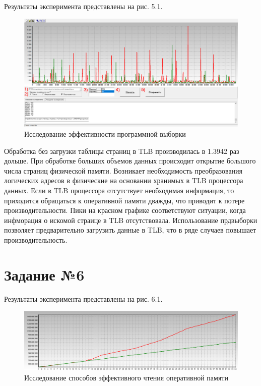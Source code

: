 Результаты эксперимента представлены на рис. 5.1.

\begin{figure}[H]
	\begin{center}
		\includegraphics[scale=0.5]{assets/task5.png}
	\end{center}
	\caption{Исследование эффективности программной выборки}
\end{figure}

Обработка без загрузки таблицы страниц в TLB производилась в 1.3942 раз дольше. При обработке больших объемов данных происходит открытие большого числа страниц физической памяти. Возникает необходимость преобразования логических адресов в физические на основании хранимых в TLB процессора данных. Если в TLB процессора отсутствует необходимая информация, то приходится обращаться к оперативной памяти дважды, что приводит к потере производительности. Пики на красном графике соответствуют ситуации, когда инфморация о искомой страице в TLB отсутствовала. Использование прдвыборки позволяет предварительно загрузить данные в TLB, что в ряде случаев повышает производительность.

\chapter{Задание №6}

Результаты эксперимента представлены на рис. 6.1.

\begin{figure}[H]
	\begin{center}
		\includegraphics[scale=0.5]{assets/task6.png}
	\end{center}
	\caption{Исследование способов эффективного чтения оперативной памяти}
\end{figure}

